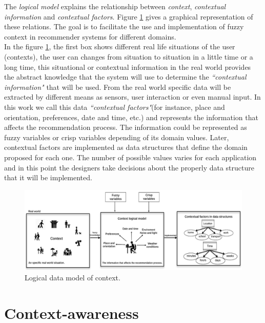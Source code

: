 The \textit{logical model} explains the relationship between \textit{context},
\textit{contextual information} and \textit{contextual factors}. 
Figure \ref{fig:logicalmodel} gives a graphical representation of these relations. 
The goal is to facilitate the use and implementation of fuzzy context 
in recommender systems for different domains.\\
In the figure \ref{fig:logicalmodel}, the first box shows different
real life situations of the user (contexts), the user can changes from situation
to situation in a little time or a long time, this situational or
contextual information in the real world provides the abstract knowledge that
the system will use to determine the \textit{``contextual information"} that will be used. 
From the real world specific data will be extracted by different means as
sensors, user interaction or even manual input. In this work 
we call this data \textit{``contextual factors"}(for instance, place and
orientation, preferences, date and time, etc.) and represents the
information that affects the recommendation process. The information
could be represented as fuzzy variables or crisp variables depending of
its domain values. Later, contextual factors are implemented as data
structures that define the domain proposed for each one. The number of
possible values varies for each application and  in this point 
the designers take decisions about the properly data structure  
that it will be implemented.
\begin{figure}
\captionsetup{font=footnotesize} \centering
\includegraphics[width=1.0\textwidth]{img/context-scheme.png}  
\small
\caption{Logical data model of context.}
\label{fig:logicalmodel}    
\end{figure} %

\section{Context-awareness} \label{context-awareness}

